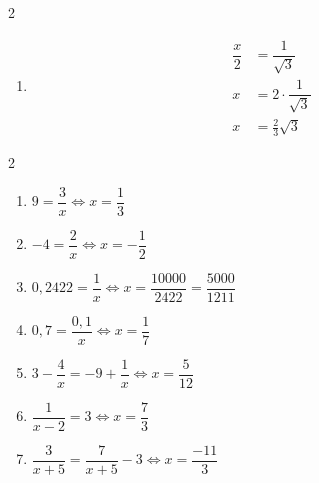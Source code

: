 {\begin{multicols}{2}
\begin{enumerate}
\begin{align*}
				\dfrac6x  &= \dfrac{\sqrt{3}}2 \\
				6 &= x \cdot \dfrac{\sqrt{3}}2 \\
				x &= 6\cdot\dfrac2{\sqrt{3}} \\
				x &= \frac{12}3 \sqrt3 = 4\sqrt3
			\end{align*}
		\item
			\begin{align*}
				\dfrac{x}2 &= \dfrac1{\sqrt{3}} \\
				x &= 2 \cdot \dfrac1{\sqrt{3}} \\
				x &= \frac23 \sqrt3
			\end{align*}
	\end{enumerate}
	\end{multicols}
}

{
	\begin{multicols}{2}
	\begin{enumerate}[itemsep=10pt]
		\item $9 = \dfrac3x \iff x = \dfrac13$
		\item $-4 = \dfrac2x \iff x=-\dfrac12$
		\item $0,2422 = \dfrac1x \iff x = \dfrac{10000}{2422} = \dfrac{5000}{1211}$
		\item $0,7 = \dfrac{0,1}x \iff x = \dfrac17$
		\item $3 - \dfrac4x = -9 + \dfrac1x \iff x = \dfrac5{12}$
		\item $\dfrac1{x-2} = 3 \iff x=\dfrac73$
		\item $\dfrac3{x+5} = \dfrac7{x+5} - 3 \iff x=\dfrac{-11}3$
	\end{enumerate}
	\end{multicols}
}


